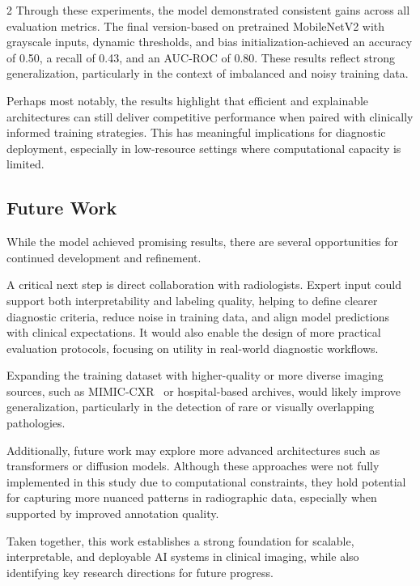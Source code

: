 \documentclass[12pt]{article}
\begin{document}
\begin{multicols}{2}
Through these experiments, the model demonstrated consistent gains across all evaluation metrics. The final version-based on pretrained MobileNetV2 with grayscale inputs, dynamic thresholds, and bias initialization-achieved an accuracy of 0.50, a recall of 0.43, and an AUC-ROC of 0.80. These results reflect strong generalization, particularly in the context of imbalanced and noisy training data.

Perhaps most notably, the results highlight that efficient and explainable architectures can still deliver competitive performance when paired with clinically informed training strategies. This has meaningful implications for diagnostic deployment, especially in low-resource settings where computational capacity is limited.

\subsection{Future Work}
While the model achieved promising results, there are several opportunities for continued development and refinement.

A critical next step is direct collaboration with radiologists. Expert input could support both interpretability and labeling quality, helping to define clearer diagnostic criteria, reduce noise in training data, and align model predictions with clinical expectations. It would also enable the design of more practical evaluation protocols, focusing on utility in real-world diagnostic workflows.

Expanding the training dataset with higher-quality or more diverse imaging sources, such as MIMIC-CXR~\cite{johnson2019mimic} or hospital-based archives, would likely improve generalization, particularly in the detection of rare or visually overlapping pathologies.

Additionally, future work may explore more advanced architectures such as transformers or diffusion models. Although these approaches were not fully implemented in this study due to computational constraints, they hold potential for capturing more nuanced patterns in radiographic data, especially when supported by improved annotation quality.

Taken together, this work establishes a strong foundation for scalable, interpretable, and deployable AI systems in clinical imaging, while also identifying key research directions for future progress.


\end{multicols}
\end{document}
